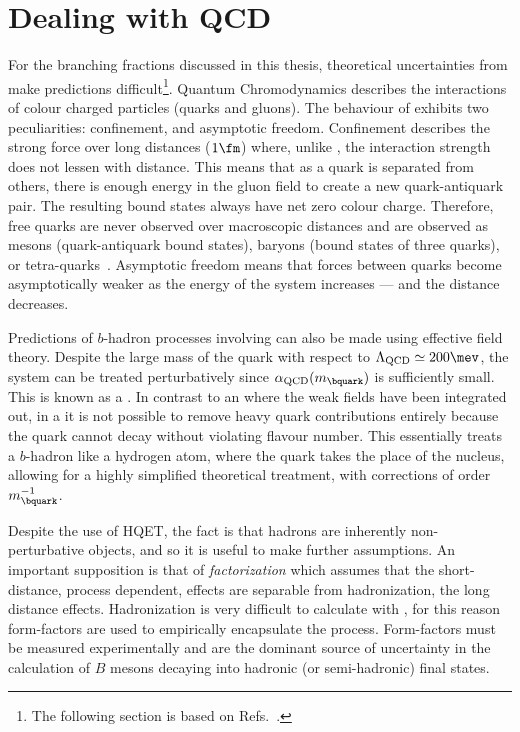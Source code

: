 \section{Dealing with QCD}

For the branching fractions discussed in this thesis, theoretical uncertainties from \QCD make
predictions difficult\footnote{
  The following section is based on Refs.~\cite{Pich:1998xt}.
}.
Quantum Chromodynamics describes the interactions of colour charged particles (quarks and
gluons).
The behaviour of \QCD exhibits two peculiarities: confinement, and asymptotic freedom.
Confinement describes the strong force over long distances (\approx$1\fm$)
where, unlike \QED, the interaction strength does not lessen with distance.
This means that as a quark is separated from others, there is enough energy in the gluon field to
create a new quark-antiquark pair.
The resulting bound states always have net zero colour charge.
Therefore, free quarks are never observed over macroscopic distances
and are observed as mesons (quark-antiquark bound states), baryons (bound states of
three quarks), or tetra-quarks~\cite{LHCb-PAPER-2014-014}.
Asymptotic freedom means that forces between quarks become asymptotically weaker as the energy of
the system increases --- and the distance decreases.

Predictions of $b$-hadron processes involving \QCD can also be made using effective field theory.
Despite the large mass of the \bquark quark with respect to $\Lambda_\mathrm{QCD}\simeq200\mev$,
the system can be treated perturbatively since $\alpha_\mathrm{QCD}(m_\bquark)$ is sufficiently
small.
This is known as a \HQET.
In contrast to an \EFT where the weak fields have been integrated out, in a \HQET
it is not possible to remove heavy quark contributions entirely because the \bquark quark
cannot decay without violating flavour number.
This essentially treats a $b$-hadron like a hydrogen atom, where the \bquark quark takes
the place of the nucleus, allowing for a highly simplified theoretical treatment, with corrections
of order $m_\bquark^{-1}$.

Despite the use of HQET, the fact is that hadrons are inherently non-perturbative objects, and so
it is useful to make further assumptions.
An important supposition is that of \emph{factorization} which assumes that the short-distance,
process dependent, \QCD effects are separable from hadronization, the long distance effects.
Hadronization is very difficult to calculate with \QCD, for this reason form-factors are used to
empirically encapsulate the process.
Form-factors must be measured experimentally and are the dominant source of uncertainty in the
calculation of $B$ mesons decaying into hadronic (or semi-hadronic) final states.





